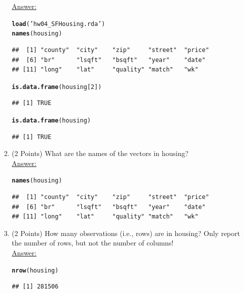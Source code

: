 \documentclass[12pt,letterpaper,final]{article}\usepackage[]{graphicx}\usepackage[]{xcolor}
\makeatletter
\newcommand{\hlnum}[1]{\textcolor[rgb]{0.686,0.059,0.569}{#1}}%
\newcommand{\hlstr}[1]{\textcolor[rgb]{0.192,0.494,0.8}{#1}}%
\newcommand{\hlstd}[1]{\textcolor[rgb]{0.345,0.345,0.345}{#1}}%
\newcommand{\hlkwd}[1]{\textcolor[rgb]{0.737,0.353,0.396}{\textbf{#1}}}%
\newenvironment{kframe}{%
 \def\at@end@of@kframe{}%
 \ifinner\ifhmode%
  \def\at@end@of@kframe{\end{minipage}}%
  \begin{minipage}{\columnwidth}%
 \fi\fi%
 \def\FrameCommand##1{\hskip\@totalleftmargin \hskip-\fboxsep
 \colorbox{shadecolor}{##1}\hskip-\fboxsep
     \hskip-\linewidth \hskip-\@totalleftmargin \hskip\columnwidth}%
 \MakeFramed {\advance\hsize-\width
   \@totalleftmargin\z@ \linewidth\hsize
   \@setminipage}}%
 {\par\unskip\endMakeFramed%
 \at@end@of@kframe}
\newenvironment{knitrout}{}{} %
\makeatother
\begin{document}
\begin{enumerate}
\begin{enumerate}
\underline{Answer:}
\begin{knitrout}
\color{fgcolor}\begin{kframe}
\begin{alltt}
\hlkwd{load}\hlstd{(}\hlstr{'hw04_SFHousing.rda'}\hlstd{)}
\hlkwd{names}\hlstd{(housing)}
\end{alltt}
\begin{verbatim}
##  [1] "county"  "city"    "zip"     "street"  "price"  
##  [6] "br"      "lsqft"   "bsqft"   "year"    "date"   
## [11] "long"    "lat"     "quality" "match"   "wk"
\end{verbatim}
\begin{alltt}
\hlkwd{is.data.frame}\hlstd{(housing[}\hlnum{2}\hlstd{])}
\end{alltt}
\begin{verbatim}
## [1] TRUE
\end{verbatim}
\begin{alltt}
\hlkwd{is.data.frame}\hlstd{(housing)}
\end{alltt}
\begin{verbatim}
## [1] TRUE
\end{verbatim}
\end{kframe}
\end{knitrout}


\item (2 Points)
What are the names of the vectors in housing? \\

\underline{Answer:}
\begin{knitrout}
\color{fgcolor}\begin{kframe}
\begin{alltt}
\hlkwd{names}\hlstd{(housing)}
\end{alltt}
\begin{verbatim}
##  [1] "county"  "city"    "zip"     "street"  "price"  
##  [6] "br"      "lsqft"   "bsqft"   "year"    "date"   
## [11] "long"    "lat"     "quality" "match"   "wk"
\end{verbatim}
\end{kframe}
\end{knitrout}


\item (2 Points)
How many observations (i.e., rows) are in housing? Only report the number of rows,
but not the number of columns! \\

\underline{Answer:}
\begin{knitrout}
\color{fgcolor}\begin{kframe}
\begin{alltt}
\hlkwd{nrow}\hlstd{(housing)}
\end{alltt}
\begin{verbatim}
## [1] 281506
\end{verbatim}
\end{kframe}
\end{knitrout}



\end{enumerate}
\end{enumerate}
\end{document}
